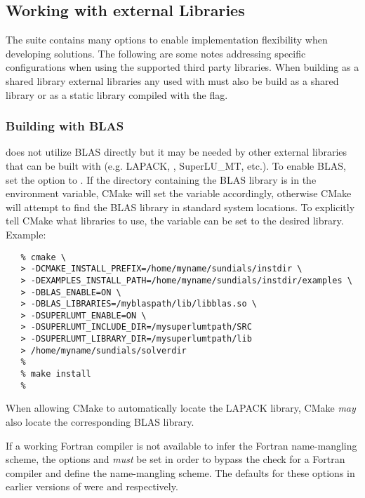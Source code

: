 \subsection{Working with external Libraries} \label{ss:externallibs}

The {\sundials} suite contains many options to enable implementation flexibility
when developing solutions. The following are some notes addressing specific configurations
when using the supported third party libraries.
When building {\sundials} as a shared library external libraries any
used with {\sundials} must also be build as a shared library or as a
static library compiled with the  flag.{\warn}

\subsubsection*{Building with BLAS}
{\sundials} does not utilize BLAS directly but it may be needed by other
external libraries that {\sundials} can be built with (e.g. LAPACK,
{\petsc}, SuperLU\_MT, etc.). To enable BLAS, set the 
option to . If the directory containing the BLAS library is in
the  environment variable, CMake will set the
 variable accordingly, otherwise CMake will
attempt to find the BLAS library in standard system locations. To
explicitly tell CMake what libraries to use, the 
variable can be set to the desired library. Example:
\begin{verbatim}
   % cmake \
   > -DCMAKE_INSTALL_PREFIX=/home/myname/sundials/instdir \
   > -DEXAMPLES_INSTALL_PATH=/home/myname/sundials/instdir/examples \
   > -DBLAS_ENABLE=ON \
   > -DBLAS_LIBRARIES=/myblaspath/lib/libblas.so \
   > -DSUPERLUMT_ENABLE=ON \
   > -DSUPERLUMT_INCLUDE_DIR=/mysuperlumtpath/SRC
   > -DSUPERLUMT_LIBRARY_DIR=/mysuperlumtpath/lib
   > /home/myname/sundials/solverdir
   %
   % make install
   %
\end{verbatim}
{\warn}When allowing CMake to automatically locate the LAPACK library,
CMake \textit{may} also locate the corresponding BLAS library.

If a working Fortran compiler is not available to infer the Fortran
name-mangling scheme, the options  and
\id{SUNDIALS\_F77\_FUNC\_UNDERSCORES} \textit{must} be set in order to
bypass the check for a Fortran compiler and define the name-mangling
scheme. The defaults for these options in earlier versions of
{\sundials} were \id{lower} and \id{one} respectively.


